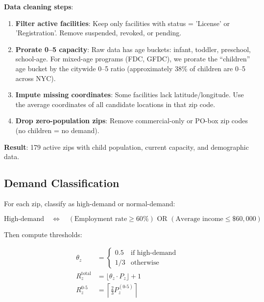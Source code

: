 \documentclass[12pt]{article}
\begin{document}
\textbf{Data cleaning steps}:

\begin{enumerate}
    \item \textbf{Filter active facilities}: Keep only facilities with status = 'License' or 'Registration'. Remove suspended, revoked, or pending.
    
    \item \textbf{Prorate 0--5 capacity}: Raw data has age buckets: infant, toddler, preschool, school-age. 
    For mixed-age programs (FDC, GFDC), we prorate the ``children'' age bucket by the citywide 0--5 ratio 
    (approximately 38\% of children are 0--5 across NYC).
    
    \item \textbf{Impute missing coordinates}: Some facilities lack latitude/longitude. Use the average coordinates 
    of all candidate locations in that zip code.
    
    \item \textbf{Drop zero-population zips}: Remove commercial-only or PO-box zip codes (no children = no demand).
\end{enumerate}

\textbf{Result}: 179 active zips with child population, current capacity, and demographic data.

\subsection{Demand Classification}

For each zip, classify as high-demand or normal-demand:

\begin{equation}
\text{High-demand} \quad \Leftrightarrow \quad (\text{Employment rate} \geq 60\%) \text{ OR } 
(\text{Average income} \leq \$60{,}000)
\end{equation}

\noindent
Then compute thresholds:

\begin{align}
\theta_z &= \begin{cases} 0.5 & \text{if high-demand} \\ 1/3 & \text{otherwise} \end{cases} \\
R_z^{\text{total}} &= \lfloor \theta_z \cdot P_z \rfloor + 1 \\
R_z^{0\text{-}5} &= \left\lceil \frac{2}{3} P_z^{(0\text{-}5)} \right\rceil
\end{align}
\end{document}
